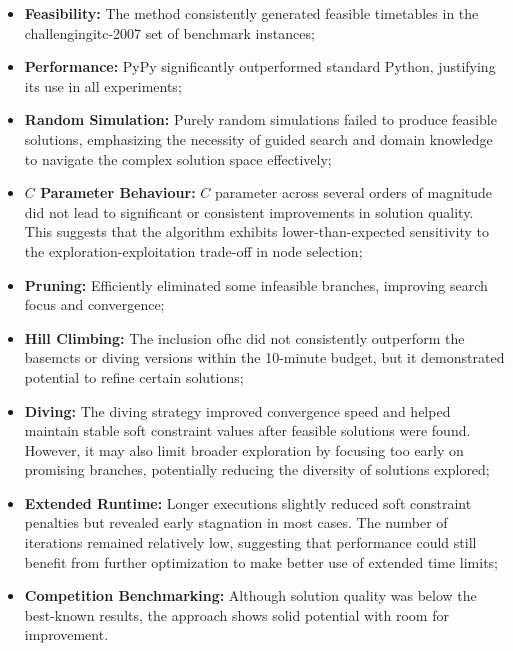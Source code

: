 \begin{itemize}
\item \textbf{Feasibility:} The method consistently generated feasible timetables in the challenging\ac{itc-2007} set of benchmark instances;

\item \textbf{Performance:} PyPy significantly outperformed standard Python, justifying its use in all experiments;

\item \textbf{Random Simulation:} Purely random simulations failed to produce feasible solutions, emphasizing the necessity of guided search and domain knowledge to navigate the complex solution space effectively;

\item \textbf{\(C\) Parameter Behaviour:} \(C\) parameter across several orders of magnitude did not lead to significant or consistent improvements in solution quality. This suggests that the algorithm exhibits lower-than-expected sensitivity to the exploration-exploitation trade-off in node selection;

\item \textbf{Pruning:} Efficiently eliminated some infeasible branches, improving search focus and convergence;

\item \textbf{Hill Climbing:} The inclusion of\ac{hc} did not consistently outperform the base\ac{mcts} or diving versions within the 10-minute budget, but it demonstrated potential to refine certain solutions;

\item \textbf{Diving:} The diving strategy improved convergence speed and helped maintain stable soft constraint values after feasible solutions were found. However, it may also limit broader exploration by focusing too early on promising branches, potentially reducing the diversity of solutions explored;

\item \textbf{Extended Runtime:} Longer executions slightly reduced soft constraint penalties but revealed early stagnation in most cases. The number of iterations remained relatively low, suggesting that performance could still benefit from further optimization to make better use of extended time limits;

\item \textbf{Competition Benchmarking:} Although solution quality was below the best-known results, the approach shows solid potential with room for improvement.
\end{itemize}